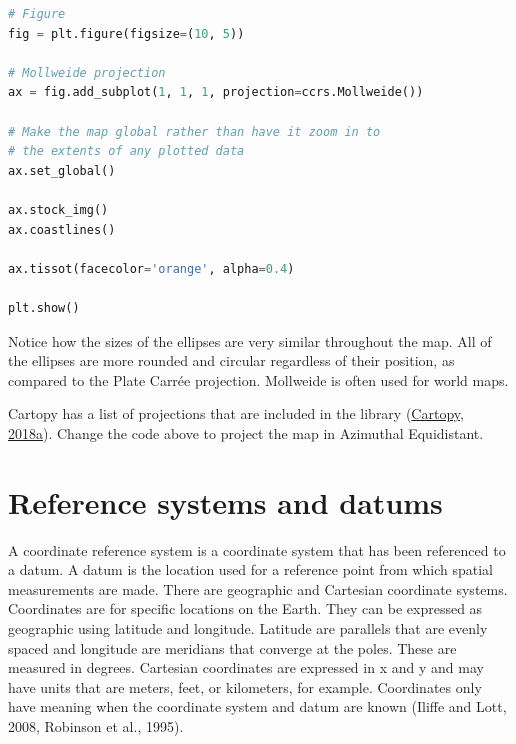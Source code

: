 \documentclass[a4paper , 12pt]{book}
\begin{document}
\begin{center}
\begin{lstlisting}[language=Python, frame=single]
# Figure
fig = plt.figure(figsize=(10, 5))

# Mollweide projection
ax = fig.add_subplot(1, 1, 1, projection=ccrs.Mollweide())

# Make the map global rather than have it zoom in to
# the extents of any plotted data
ax.set_global()

ax.stock_img()
ax.coastlines()

ax.tissot(facecolor='orange', alpha=0.4)

plt.show()
\end{lstlisting}
\end{center}

Notice how the sizes of the ellipses are very similar throughout the map. All of the ellipses are more rounded and circular regardless of their position, as compared to the Plate Carrée projection. Mollweide is often used for world maps.

Cartopy has a list of projections that are included in the library  (\href{https://scitools.org.uk/cartopy/docs/latest/crs/projections.html}{Cartopy, 2018a}). Change the code above to project the map in Azimuthal Equidistant. 

\section{Reference systems and datums}

A coordinate reference system is a coordinate system that has been referenced to a datum. A datum is the location used for a reference point from which spatial measurements are made. There are geographic and Cartesian coordinate systems. Coordinates are for specific locations on the Earth. They can be expressed as geographic using latitude and longitude. Latitude are parallels that are evenly spaced and longitude are meridians that converge at the poles. These are measured in degrees. Cartesian coordinates are expressed in x and y and may have units that are meters, feet, or kilometers, for example. Coordinates only have meaning when the coordinate system and datum are known (Iliffe and Lott, 2008, Robinson et al., 1995). 
\end{document}
